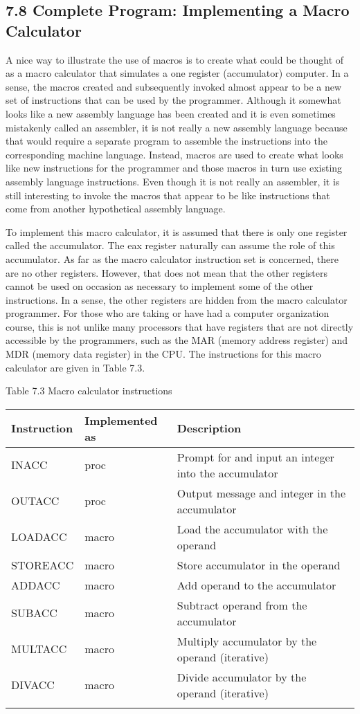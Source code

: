\documentclass[10pt]{article}
\begin{document}
\subsection*{7.8 Complete Program: Implementing a Macro Calculator}
A nice way to illustrate the use of macros is to create what could be thought of as a macro calculator that simulates a one register (accumulator) computer. In a sense, the macros created and subsequently invoked almost appear to be a new set of instructions that can be used by the programmer. Although it somewhat looks like a new assembly language has been created and it is even sometimes mistakenly called an assembler, it is not really a new assembly language because that would require a separate program to assemble the instructions into the corresponding machine language. Instead, macros are used to create what looks like new instructions for the programmer and those macros in turn use existing assembly language instructions. Even though it is not really an assembler, it is still interesting to invoke the macros that appear to be like instructions that come from another hypothetical assembly language.

To implement this macro calculator, it is assumed that there is only one register called the accumulator. The eax register naturally can assume the role of this accumulator. As far as the macro calculator instruction set is concerned, there are no other registers. However, that does not mean that the other registers cannot be used on occasion as necessary to implement some of the other instructions. In a sense, the other registers are hidden from the macro calculator programmer. For those who are taking or have had a computer organization course, this is not unlike many processors that have registers that are not directly accessible by the programmers, such as the MAR (memory address register) and MDR (memory data register) in the CPU. The instructions for this macro calculator are given in Table 7.3.

Table 7.3 Macro calculator instructions

\begin{center}
\begin{tabular}{|lll|}
\hline
Instruction & Implemented as & Description \\
\hline
INACC & proc & Prompt for and input an integer into the accumulator \\
OUTACC & proc & Output message and integer in the accumulator \\
LOADACC & macro & Load the accumulator with the operand \\
STOREACC & macro & Store accumulator in the operand \\
ADDACC & macro & Add operand to the accumulator \\
SUBACC & macro & Subtract operand from the accumulator \\
MULTACC & macro & Multiply accumulator by the operand (iterative) \\
DIVACC & macro & Divide accumulator by the operand (iterative) \\
 &  &  \\
\hline
\end{tabular}
\end{center}
\end{document}
